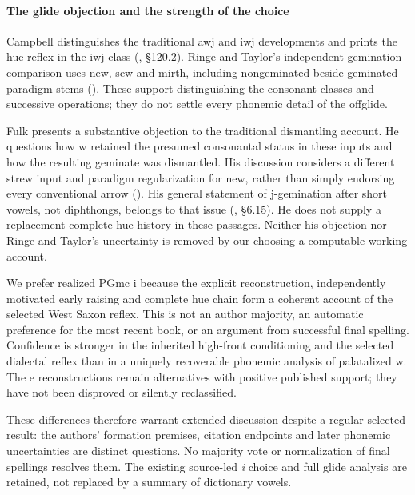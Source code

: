 \documentclass[
  british,
  a4paper,
]{article}
\begin{document}
\paragraph{The glide objection and the strength of the
choice}\label{the-glide-objection-and-the-strength-of-the-choice}

Campbell distinguishes the traditional awj and iwj developments and
prints the hue reflex in the iwj class
(, §120.2). Ringe and
Taylor's independent gemination comparison uses new, sew and mirth,
including nongeminated beside geminated paradigm stems
(). These
support distinguishing the consonant classes and successive operations;
they do not settle every phonemic detail of the offglide.

Fulk presents a substantive objection to the traditional dismantling
account. He questions how w retained the presumed consonantal status in
these inputs and how the resulting geminate was dismantled. His
discussion considers a different strew input and paradigm regularization
for new, rather than simply endorsing every conventional arrow
(). His general statement of
j-gemination after short vowels, not diphthongs, belongs to that issue
(, §6.15). He does not supply a
replacement complete hue history in these passages. Neither his
objection nor Ringe and Taylor's uncertainty is removed by our choosing
a computable working account.

We prefer realized PGmc i because the explicit reconstruction,
independently motivated early raising and complete hue chain form a
coherent account of the selected West Saxon reflex. This is not an
author majority, an automatic preference for the most recent book, or an
argument from successful final spelling. Confidence is stronger in the
inherited high-front conditioning and the selected dialectal reflex than
in a uniquely recoverable phonemic analysis of palatalized w. The e
reconstructions remain alternatives with positive published support;
they have not been disproved or silently reclassified.

These differences therefore warrant extended discussion despite a
regular selected result: the authors' formation premises, citation
endpoints and later phonemic uncertainties are distinct questions. No
majority vote or normalization of final spellings resolves them. The
existing source-led \emph{i} choice and full glide analysis are
retained, not replaced by a summary of dictionary vowels.
\end{document}
